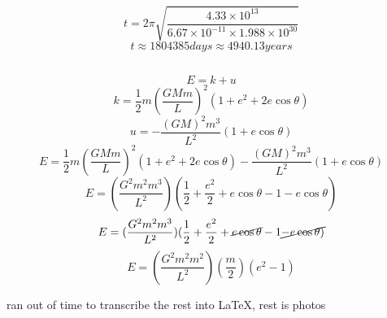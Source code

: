 \documentclass{article}
\begin{document}
\[t = 2\pi\sqrt{\frac{4.33 \times 10^{13}}{6.67 \times 10^{-11} \times 1.988 \times 10^{30}}}\]
\[t \approx 1804385 days \approx 4940.13 years\]

\subsection{}
\subsubsection{}
\[E = k + u\]
\[k = \frac{1}{2}m (\frac{GMm}{L})^2 (1+e^2 +2e \cos\theta)\]
\[u = - \frac{(GM)^2m^3}{L^2}(1+e\cos\theta)\]
\[E = \frac{1}{2}m (\frac{GMm}{L})^2 (1+e^2 +2e \cos\theta) - \frac{(GM)^2m^3}{L^2}(1+e\cos\theta) \]
\[E = (\frac{G^2m^2m^3}{L^2})(\frac{1}{2} + \frac{e^2}{2} + e\cos\theta - 1 -e\cos\theta)\]
\[E = (\frac{G^2m^2m^3}{L^2})(\frac{1}{2} + \frac{e^2}{2} + \cancel{e\cos\theta} - 1 \cancel{-e\cos\theta)}\]
\[E = (\frac{G^2m^2m^2}{L^2})(\frac{m}{2})(e^2-1)\]


\begin{center}
    ran out of time to transcribe the rest into \LaTeX, rest is photos
\end{center}
\end{document}
